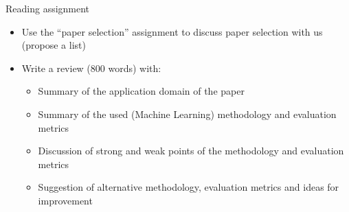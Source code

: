 \documentclass[notes]{beamer}          %
\begin{document}
\begin{frame}{Reading assignment}
\begin{itemize}
    \item Use the ``paper selection'' assignment to discuss paper selection with us (propose a list)
    \item Write a review (800 words) with:
    \begin{itemize}
    		\item Summary of the application domain of the paper
    		\item Summary of the used (Machine Learning) methodology and evaluation metrics
		\item Discussion of strong and weak points of the methodology and evaluation metrics
		\item Suggestion of alternative methodology, evaluation metrics and ideas for improvement
    \end{itemize}
\end{itemize}    
\end{frame}
\end{document}
